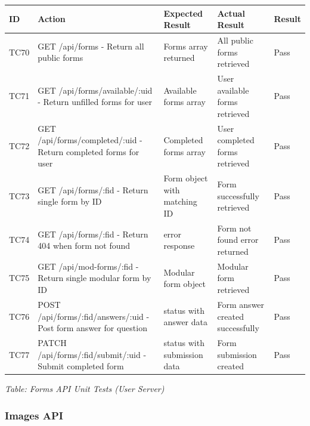 \documentclass[12pt, titlepage]{article}
\begin{document}
\noindent
\begin{longtable}{|>{\raggedright\arraybackslash}p{1cm}|>{\raggedright\arraybackslash}p{4.5cm}|>{\raggedright\arraybackslash}p{3.5cm}|>{\raggedright\arraybackslash}p{3.5cm}|>{\raggedright\arraybackslash}p{1.5cm}|}
\hline
\textbf{ID} & \textbf{Action} & \textbf{Expected Result} & \textbf{Actual Result} & \textbf{Result} \\\hline
\endhead
\hline
TC70 & GET /api/forms - Return all public forms & Forms array returned & All public forms retrieved & \cellcolor{green!30}Pass \\
\hline
TC71 & GET /api/forms/available/:uid - Return unfilled forms for user & Available forms array & User available forms retrieved & \cellcolor{green!30}Pass \\
\hline
TC72 & GET /api/forms/completed/:uid - Return completed forms for user & Completed forms array & User completed forms retrieved & \cellcolor{green!30}Pass \\
\hline
TC73 & GET /api/forms/:fid - Return single form by ID & Form object with matching ID & Form successfully retrieved & \cellcolor{green!30}Pass \\
\hline
TC74 & GET /api/forms/:fid - Return 404 when form not found & 404 error response & Form not found error returned & \cellcolor{green!30}Pass \\
\hline
TC75 & GET /api/mod-forms/:fid - Return single modular form by ID & Modular form object & Modular form retrieved & \cellcolor{green!30}Pass \\
\hline
TC76 & POST /api/forms/:fid/answers/:uid - Post form answer for question & 201 status with answer data & Form answer created successfully & \cellcolor{green!30}Pass \\
\hline
TC77 & PATCH /api/forms/:fid/submit/:uid - Submit completed form & 200 status with submission data & Form submission created & \cellcolor{green!30}Pass \\
\hline
\end{longtable}

\vspace{0.5cm}

{\small \textit{Table: Forms API Unit Tests (User Server)}}

\subsubsection{Images API}
\end{document}
